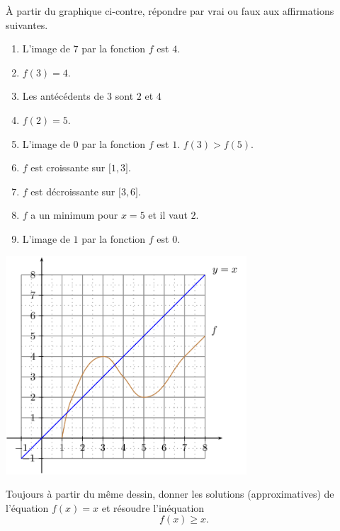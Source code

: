 
\begin{exercice}\label{exoSeconde-0069}

    \begin{multicols}{2}

À partir du graphique ci-contre, répondre par vrai ou faux aux affirmations suivantes.

\begin{enumerate}
   \item
       L'image de \( 7\) par la fonction \( f\) est \( 4\).
   \item
       \( f(3)=4\).
   \item
       Les antécédents de \( 3\) sont \( 2\) et \( 4\)
   \item
       \( f(2)=5\).
   \item
       L'image de \( 0\) par la fonction \( f\) est \( 1\).
       \( f(3)>f(5)\).
   \item
       \( f\) est croissante sur \( \mathopen[ 1 , 3 \mathclose]\).
   \item
       \( f\) est décroissante sur \( \mathopen[ 3 , 6 \mathclose]\).
    \item
        \( f\) a un minimum pour \( x=5\) et il vaut \( 2\).
    \item
       L'image de \( 1\) par la fonction \( f\) est \( 0\).
\end{enumerate}

\columnbreak


\includegraphics[width=9.0cm]{Picture_FIGLabelFigExoIntersectionCourbenzIxXdPICTExoIntersectionCourbenzIxXd-for_eps.png}

    \end{multicols}

Toujours à partir du même dessin, donner les solutions (approximatives) de l'équation \( f(x)=x\) et résoudre l'inéquation
\begin{equation}
    f(x)\geq x.
\end{equation}


\end{exercice}
